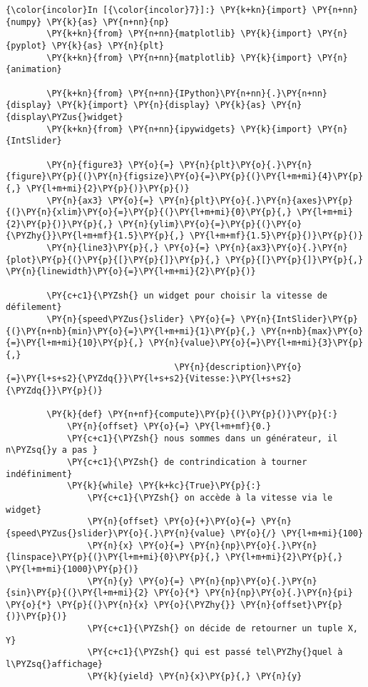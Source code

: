     \begin{Verbatim}[commandchars=\\\{\}]
{\color{incolor}In [{\color{incolor}7}]:} \PY{k+kn}{import} \PY{n+nn}{numpy} \PY{k}{as} \PY{n+nn}{np}
        \PY{k+kn}{from} \PY{n+nn}{matplotlib} \PY{k}{import} \PY{n}{pyplot} \PY{k}{as} \PY{n}{plt}
        \PY{k+kn}{from} \PY{n+nn}{matplotlib} \PY{k}{import} \PY{n}{animation}
        
        \PY{k+kn}{from} \PY{n+nn}{IPython}\PY{n+nn}{.}\PY{n+nn}{display} \PY{k}{import} \PY{n}{display} \PY{k}{as} \PY{n}{display\PYZus{}widget}
        \PY{k+kn}{from} \PY{n+nn}{ipywidgets} \PY{k}{import} \PY{n}{IntSlider}
        
        \PY{n}{figure3} \PY{o}{=} \PY{n}{plt}\PY{o}{.}\PY{n}{figure}\PY{p}{(}\PY{n}{figsize}\PY{o}{=}\PY{p}{(}\PY{l+m+mi}{4}\PY{p}{,} \PY{l+m+mi}{2}\PY{p}{)}\PY{p}{)}
        \PY{n}{ax3} \PY{o}{=} \PY{n}{plt}\PY{o}{.}\PY{n}{axes}\PY{p}{(}\PY{n}{xlim}\PY{o}{=}\PY{p}{(}\PY{l+m+mi}{0}\PY{p}{,} \PY{l+m+mi}{2}\PY{p}{)}\PY{p}{,} \PY{n}{ylim}\PY{o}{=}\PY{p}{(}\PY{o}{\PYZhy{}}\PY{l+m+mf}{1.5}\PY{p}{,} \PY{l+m+mf}{1.5}\PY{p}{)}\PY{p}{)}
        \PY{n}{line3}\PY{p}{,} \PY{o}{=} \PY{n}{ax3}\PY{o}{.}\PY{n}{plot}\PY{p}{(}\PY{p}{[}\PY{p}{]}\PY{p}{,} \PY{p}{[}\PY{p}{]}\PY{p}{,} \PY{n}{linewidth}\PY{o}{=}\PY{l+m+mi}{2}\PY{p}{)}
        
        \PY{c+c1}{\PYZsh{} un widget pour choisir la vitesse de défilement}
        \PY{n}{speed\PYZus{}slider} \PY{o}{=} \PY{n}{IntSlider}\PY{p}{(}\PY{n+nb}{min}\PY{o}{=}\PY{l+m+mi}{1}\PY{p}{,} \PY{n+nb}{max}\PY{o}{=}\PY{l+m+mi}{10}\PY{p}{,} \PY{n}{value}\PY{o}{=}\PY{l+m+mi}{3}\PY{p}{,}
                                 \PY{n}{description}\PY{o}{=}\PY{l+s+s2}{\PYZdq{}}\PY{l+s+s2}{Vitesse:}\PY{l+s+s2}{\PYZdq{}}\PY{p}{)}
        
        \PY{k}{def} \PY{n+nf}{compute}\PY{p}{(}\PY{p}{)}\PY{p}{:}
            \PY{n}{offset} \PY{o}{=} \PY{l+m+mf}{0.}
            \PY{c+c1}{\PYZsh{} nous sommes dans un générateur, il n\PYZsq{}y a pas }
            \PY{c+c1}{\PYZsh{} de contrindication à tourner indéfiniment}
            \PY{k}{while} \PY{k+kc}{True}\PY{p}{:}
                \PY{c+c1}{\PYZsh{} on accède à la vitesse via le widget}
                \PY{n}{offset} \PY{o}{+}\PY{o}{=} \PY{n}{speed\PYZus{}slider}\PY{o}{.}\PY{n}{value} \PY{o}{/} \PY{l+m+mi}{100}
                \PY{n}{x} \PY{o}{=} \PY{n}{np}\PY{o}{.}\PY{n}{linspace}\PY{p}{(}\PY{l+m+mi}{0}\PY{p}{,} \PY{l+m+mi}{2}\PY{p}{,} \PY{l+m+mi}{1000}\PY{p}{)}
                \PY{n}{y} \PY{o}{=} \PY{n}{np}\PY{o}{.}\PY{n}{sin}\PY{p}{(}\PY{l+m+mi}{2} \PY{o}{*} \PY{n}{np}\PY{o}{.}\PY{n}{pi} \PY{o}{*} \PY{p}{(}\PY{n}{x} \PY{o}{\PYZhy{}} \PY{n}{offset}\PY{p}{)}\PY{p}{)}
                \PY{c+c1}{\PYZsh{} on décide de retourner un tuple X, Y}
                \PY{c+c1}{\PYZsh{} qui est passé tel\PYZhy{}quel à l\PYZsq{}affichage}
                \PY{k}{yield} \PY{n}{x}\PY{p}{,} \PY{n}{y} 
        

\end{Verbatim}
